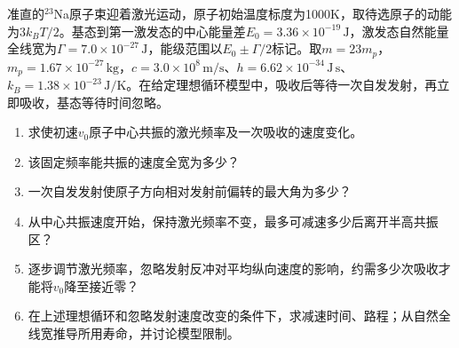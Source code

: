 \documentclass[UTF8,fontset=fandol,a4paper,11pt]{ctexart}
\begin{document}
准直的$^{23}$Na原子束迎着激光运动，原子初始温度标度为1000K，取待选原子的动能为$3k_BT/2$。基态到第一激发态的中心能量差$E_0=3.36\times10^{-19}\,\mathrm J$，激发态自然能量全线宽为$\Gamma=7.0\times10^{-27}\,\mathrm J$，能级范围以$E_0\pm\Gamma/2$标记。取$m=23m_p$，$m_p=1.67\times10^{-27}\,\mathrm{kg}$，$c=3.0\times10^8\,\mathrm{m/s}$、$h=6.62\times10^{-34}\,\mathrm{J\,s}$、$k_B=1.38\times10^{-23}\,\mathrm{J/K}$。在给定理想循环模型中，吸收后等待一次自发发射，再立即吸收，基态等待时间忽略。
\begin{enumerate}[label=（\arabic*）]
\item 求使初速$v_0$原子中心共振的激光频率及一次吸收的速度变化。
\item 该固定频率能共振的速度全宽为多少？
\item 一次自发发射使原子方向相对发射前偏转的最大角为多少？
\item 从中心共振速度开始，保持激光频率不变，最多可减速多少后离开半高共振区？
\item 逐步调节激光频率，忽略发射反冲对平均纵向速度的影响，约需多少次吸收才能将$v_0$降至接近零？
\item 在上述理想循环和忽略发射速度改变的条件下，求减速时间、路程；从自然全线宽推导所用寿命，并讨论模型限制。
\end{enumerate}
\end{document}
